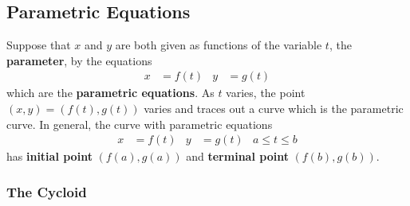 \subsection{Parametric Equations}

Suppose that \(x\) and \(y\) are both given as functions of the variable
\(t\), the \textbf{parameter}, by the equations
\begin{align*}
    x &= f(t) & y &= g(t)
\end{align*}
which are the \textbf{parametric equations}.
As \(t\) varies, the point \((x,y)=(f(t),g(t))\) varies and traces out a curve
which is the parametric curve.
In general, the curve with parametric equations
\begin{align*}
    x &= f(t) & y &= g(t) & a\leq t\leq b
\end{align*}
has \textbf{initial point} \((f(a),g(a))\) and \textbf{terminal point}
\((f(b),g(b))\).

\subsubsection*{The Cycloid}